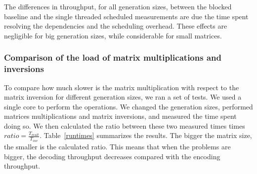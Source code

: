 The differences in throughput, for all generation sizes, between the blocked
baseline and the single threaded scheduled measurements are due the time spent
resolving the dependencies and the scheduling overhead. These effects are
negligible for big generation sizes, while considerable for small matrices.

%
%



\subsubsection{Comparison of the load of matrix multiplications and inversions}

To compare how much slower is the matrix multiplication with respect to the
matrix inversion for different generation sizes, we ran a set of tests. We used
a single core to perform the operations. We changed the generation sizes,
performed matrices multiplications and matrix inversions, and measured the time
spent doing so. We then calculated the ratio between these two measured times
times $ratio = \frac{T_{mult}}{T_{inv}}$. Table~\ref{runtimes} summarizes the
results. The bigger the matrix size, the smaller is the calculated ratio. This
means that when the problems are bigger, the decoding throughput decreases
compared with the encoding throughput.

